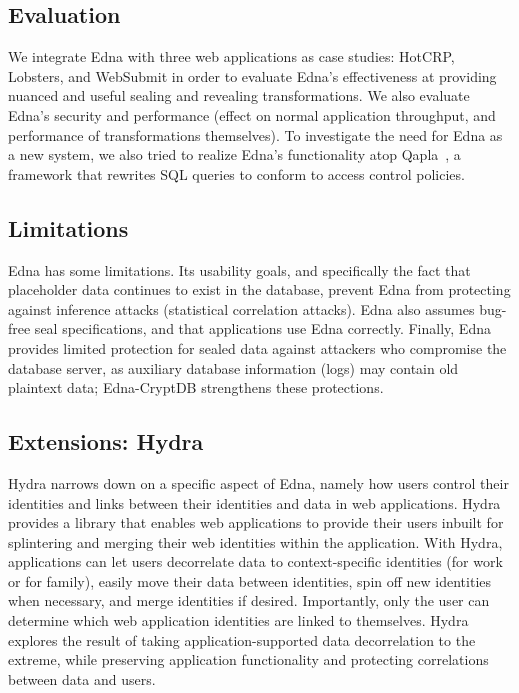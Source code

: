 \subsection{Evaluation}
We integrate Edna with three web applications as case studies: HotCRP, Lobsters,
and WebSubmit in order to evaluate Edna's effectiveness at providing nuanced and
useful sealing and revealing transformations.
%
We also evaluate Edna's security and performance (\eg effect on normal
application throughput, and performance of transformations themselves).
%
To investigate the need for Edna as a new system, we also tried to realize Edna's
functionality atop Qapla~\cite{qapla}, a framework that rewrites SQL queries to
conform to access control policies. 

\subsection{Limitations}
Edna has some limitations. Its usability goals, and specifically the fact that
placeholder data continues to exist in the database, prevent Edna from
protecting against inference attacks (\eg statistical correlation attacks). Edna
also assumes bug-free seal specifications, and that applications use
Edna correctly. Finally, Edna provides limited protection for sealed data
against attackers who compromise the database server, as auxiliary database
information (\eg logs) may contain old plaintext data; Edna-CryptDB strengthens
these protections.

\subsection{Extensions: Hydra}
Hydra narrows down on a specific aspect of Edna, namely how users control their
identities and links between their identities and data in web applications.
%
Hydra provides a library that enables web applications to provide their
users inbuilt for splintering and merging their web identities within the
application. With Hydra, applications can let users decorrelate data to
context-specific identities (\eg for work or for family), easily
move their data between identities, spin off new identities when necessary, and
merge identities if desired. Importantly, only the user can determine which
web application identities are linked to themselves.
%
Hydra explores the result of taking application-supported data
decorrelation to the extreme, while preserving application functionality and
protecting correlations between data and users. 

